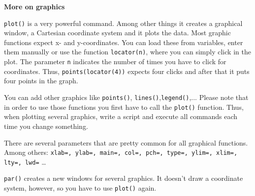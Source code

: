 \begin{Solution}{4}
\textbf{More on graphics }

\texttt{plot()} is a very powerful command. Among other things it creates a graphical window, a Cartesian coordinate system and it plots the data. Most graphic functions expect x- and y-coordinates. You can load these from variables, enter them manually or use the function \texttt{locator(n)}, where you can simply click in the plot. The parameter \texttt{n} indicates the number of times you have to click for coordinates. Thus, \texttt{points(locator(4))} expects four clicks and after that it puts four points in the graph.

You can add other graphics like \texttt{points()}, \texttt{lines()},\texttt{legend()},... Please note that in order to use those functions you first have to call the \texttt{plot()} function. Thus, when plotting several graphics, write a script and execute all commands each time you change something.

There are several parameters that are pretty common for all graphical functions. Among others: \texttt{xlab=, ylab=, main=, col=, pch=, type=, ylim=, xlim=, lty=, lwd=} \dots

\texttt{par()} creates a new windows for several graphics. It doesn't draw a coordinate system, however, so you have to use \texttt{plot()} again.
\end{Solution}
